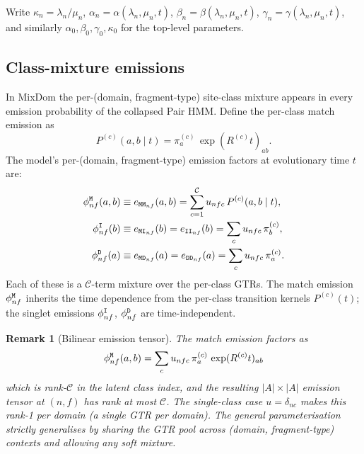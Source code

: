 \documentclass{article}
\newtheorem{remark}{Remark}
\newcommand\insrate{\lambda}
\newcommand\delrate{\mu}
\newcommand\main{0}
\newcommand\dom{n}
\newcommand\classdist{u}
\newcommand\anctok{a}
\newcommand\destok{b}
\newcommand\alphabet{A}
\newcommand\eqm{\pi}
\providecommand\revsub{R}
\newcommand\evoltime{t}
\newcommand\mat{{\tt M}}
\newcommand\ins{{\tt I}}
\newcommand\del{{\tt D}}
\newcommand\emprob{e}
\newcommand\frag{f}
\newcommand\class{c}
\newcommand\nclasses{\mathcal{C}}
\begin{document}
Write $\kappa_\dom = \insrate_\dom / \delrate_\dom$,
$\alpha_\dom = \alpha(\insrate_\dom, \delrate_\dom, \evoltime)$,
$\beta_\dom = \beta(\insrate_\dom, \delrate_\dom, \evoltime)$,
$\gamma_\dom = \gamma(\insrate_\dom, \delrate_\dom, \evoltime)$,
and similarly $\alpha_\main, \beta_\main, \gamma_\main, \kappa_\main$
for the top-level parameters.

\subsection{Class-mixture emissions}
\label{sec:class-mixture-emissions}

In MixDom the per-(domain, fragment-type) site-class mixture
appears in every emission probability of the collapsed Pair HMM.
Define the per-class match emission as
\[
P^{(\class)}(\anctok,\destok\mid\evoltime)
= \eqm^{(\class)}_\anctok\, \exp(\revsub^{(\class)}\evoltime)_{\anctok\destok}.
\]
The model's per-(domain, fragment-type) emission factors at evolutionary time $\evoltime$ are:
\begin{align*}
\phi^{\mat}_{\dom\frag}(\anctok, \destok)
  &\equiv \emprob_{\mat\mat_{\dom\frag}}(\anctok,\destok)
  = \sum_{\class=1}^{\nclasses} \classdist_{\dom\frag\class}\,
    P^{(\class)}(\anctok,\destok\mid\evoltime), \\
\phi^{\ins}_{\dom\frag}(\destok)
  &\equiv \emprob_{\mat\ins_{\dom\frag}}(\destok)
       = \emprob_{\ins\ins_{\dom\frag}}(\destok)
  = \sum_\class \classdist_{\dom\frag\class}\, \eqm^{(\class)}_\destok, \\
\phi^{\del}_{\dom\frag}(\anctok)
  &\equiv \emprob_{\mat\del_{\dom\frag}}(\anctok)
       = \emprob_{\del\del_{\dom\frag}}(\anctok)
  = \sum_\class \classdist_{\dom\frag\class}\, \eqm^{(\class)}_\anctok.
\end{align*}
Each of these is a $\nclasses$-term mixture over the per-class GTRs.
The match emission $\phi^{\mat}_{\dom\frag}$ inherits the time
dependence from the per-class transition kernels $P^{(\class)}(\evoltime)$;
the singlet emissions $\phi^{\ins}_{\dom\frag}$, $\phi^{\del}_{\dom\frag}$
are time-independent.

\begin{remark}[Bilinear emission tensor]
The match emission factors as
\[
\phi^{\mat}_{\dom\frag}(\anctok,\destok)
= \sum_{\class} \classdist_{\dom\frag\class}\, \eqm^{(\class)}_\anctok\,
  \exp(\revsub^{(\class)}\evoltime)_{\anctok\destok}
\]
which is rank-$\nclasses$ in the latent class index, and the resulting
$|\alphabet| \times |\alphabet|$ emission tensor at $(\dom,\frag)$ has
rank at most $\nclasses$. The single-class case $\classdist = \delta_{\dom\class}$
makes this rank-1 per domain (a single GTR per domain). The general parameterisation strictly
generalises by sharing the GTR pool across (domain, fragment-type)
contexts and allowing any soft mixture.
\end{remark}
\end{document}
